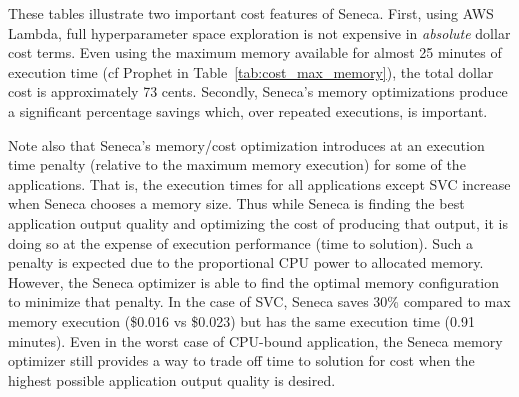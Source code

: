 These tables illustrate two important cost features of Seneca.  First, using
AWS Lambda, full hyperparameter space exploration is not expensive in 
\textit{absolute} dollar cost terms.  Even using the maximum memory available
for almost 25 minutes of execution time (cf Prophet in Table~\ref{tab:cost_max_memory}), the
total dollar cost is approximately 73 cents.  Secondly, Seneca's memory
optimizations produce a significant percentage savings which, over repeated
executions, is important.  

Note also that Seneca's memory/cost optimization
introduces at an execution time penalty (relative to the maximum memory
execution) for some of the applications.  That is, the
execution times for all applications except SVC increase when Seneca chooses
a memory size.  Thus while Seneca is finding the best application output
quality and optimizing the cost of producing that output, it is doing so at
the expense of execution performance (time to solution). Such a penalty
is expected due to the proportional CPU power to allocated
memory. However, the Seneca optimizer is able to find the optimal
memory configuration to minimize that  penalty. In the case of SVC, Seneca saves 30\% compared to max memory execution (\$0.016 vs \$0.023) but has the same execution time (0.91 minutes).
Even in the worst case of CPU-bound application, the Seneca memory optimizer still provides a way to trade off time to solution for cost when the highest possible application output quality is desired.




